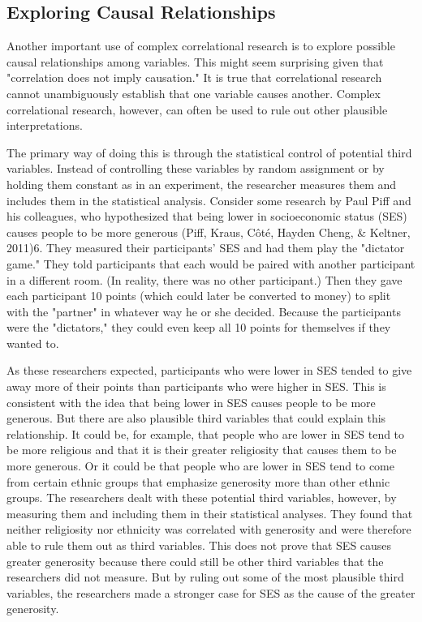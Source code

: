 \subsection{Exploring Causal Relationships}

Another important use of complex correlational research is to explore possible causal relationships among variables. This might seem surprising given that "correlation does not imply causation." It is true that correlational research cannot unambiguously establish that one variable causes another. Complex correlational research, however, can often be used to rule out other plausible interpretations.

The primary way of doing this is through the statistical control of potential third variables. Instead of controlling these variables by random assignment or by holding them constant as in an experiment, the researcher measures them and includes them in the statistical analysis. Consider some research by Paul Piff and his colleagues, who hypothesized that being lower in socioeconomic status (SES) causes people to be more generous (Piff, Kraus, Côté, Hayden Cheng, \& Keltner, 2011)6. They measured their participants' SES and had them play the "dictator game." They told participants that each would be paired with another participant in a different room. (In reality, there was no other participant.) Then they gave each participant 10 points (which could later be converted to money) to split with the "partner" in whatever way he or she decided. Because the participants were the "dictators," they could even keep all 10 points for themselves if they wanted to.

As these researchers expected, participants who were lower in SES tended to give away more of their points than participants who were higher in SES. This is consistent with the idea that being lower in SES causes people to be more generous. But there are also plausible third variables that could explain this relationship. It could be, for example, that people who are lower in SES tend to be more religious and that it is their greater religiosity that causes them to be more generous. Or it could be that people who are lower in SES tend to come from certain ethnic groups that emphasize generosity more than other ethnic groups. The researchers dealt with these potential third variables, however, by measuring them and including them in their statistical analyses. They found that neither religiosity nor ethnicity was correlated with generosity and were therefore able to rule them out as third variables. This does not prove that SES causes greater generosity because there could still be other third variables that the researchers did not measure. But by ruling out some of the most plausible third variables, the researchers made a stronger case for SES as the cause of the greater generosity.

